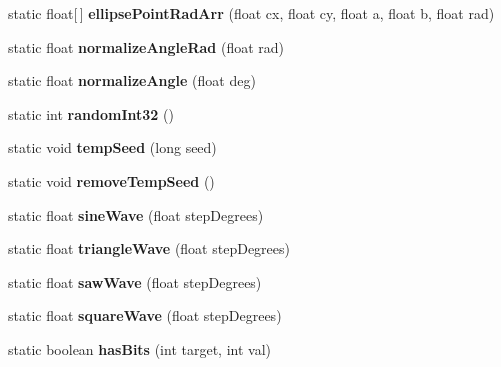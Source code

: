 \begin{DoxyCompactItemize}
\item 
\hypertarget{classhype_1_1util_1_1_h_math_a0ed7dff059ec1f5e67ed231e715f030d}{static float\mbox{[}$\,$\mbox{]} {\bfseries ellipse\-Point\-Rad\-Arr} (float cx, float cy, float a, float b, float rad)}\label{classhype_1_1util_1_1_h_math_a0ed7dff059ec1f5e67ed231e715f030d}

\item 
\hypertarget{classhype_1_1util_1_1_h_math_ae4d6fb62a48211c091adad7ef17b17ac}{static float {\bfseries normalize\-Angle\-Rad} (float rad)}\label{classhype_1_1util_1_1_h_math_ae4d6fb62a48211c091adad7ef17b17ac}

\item 
\hypertarget{classhype_1_1util_1_1_h_math_aa641b5124a8cc29ff96c589a3add2135}{static float {\bfseries normalize\-Angle} (float deg)}\label{classhype_1_1util_1_1_h_math_aa641b5124a8cc29ff96c589a3add2135}

\item 
\hypertarget{classhype_1_1util_1_1_h_math_a0bbeefb9f57d4341c5059687ad528682}{static int {\bfseries random\-Int32} ()}\label{classhype_1_1util_1_1_h_math_a0bbeefb9f57d4341c5059687ad528682}

\item 
\hypertarget{classhype_1_1util_1_1_h_math_aaa0f2ca11fbdaaa363c5c29ff1acf58b}{static void {\bfseries temp\-Seed} (long seed)}\label{classhype_1_1util_1_1_h_math_aaa0f2ca11fbdaaa363c5c29ff1acf58b}

\item 
\hypertarget{classhype_1_1util_1_1_h_math_a6209cbef5f9754065c2a7cdc38b43665}{static void {\bfseries remove\-Temp\-Seed} ()}\label{classhype_1_1util_1_1_h_math_a6209cbef5f9754065c2a7cdc38b43665}

\item 
\hypertarget{classhype_1_1util_1_1_h_math_a70432ca80abf61919404cd778100304a}{static float {\bfseries sine\-Wave} (float step\-Degrees)}\label{classhype_1_1util_1_1_h_math_a70432ca80abf61919404cd778100304a}

\item 
\hypertarget{classhype_1_1util_1_1_h_math_ad485c46a803bce9ecb67ffbc995e027a}{static float {\bfseries triangle\-Wave} (float step\-Degrees)}\label{classhype_1_1util_1_1_h_math_ad485c46a803bce9ecb67ffbc995e027a}

\item 
\hypertarget{classhype_1_1util_1_1_h_math_ae2cbf7905c5ec87a10ea532f2164f861}{static float {\bfseries saw\-Wave} (float step\-Degrees)}\label{classhype_1_1util_1_1_h_math_ae2cbf7905c5ec87a10ea532f2164f861}

\item 
\hypertarget{classhype_1_1util_1_1_h_math_a8fd18e82bb54ba01f12b3b87d329ec5f}{static float {\bfseries square\-Wave} (float step\-Degrees)}\label{classhype_1_1util_1_1_h_math_a8fd18e82bb54ba01f12b3b87d329ec5f}

\item 
\hypertarget{classhype_1_1util_1_1_h_math_af99cc1d7b58081d9f54187f49bfca833}{static boolean {\bfseries has\-Bits} (int target, int val)}\label{classhype_1_1util_1_1_h_math_af99cc1d7b58081d9f54187f49bfca833}

\end{DoxyCompactItemize}

